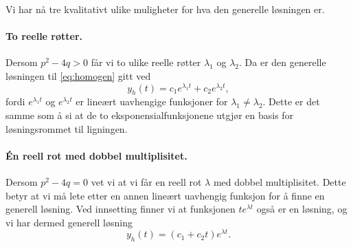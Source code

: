 \documentclass{article}
\theoremstyle{definition}
\theoremstyle{remark}
\begin{document}
\begin{multicols*}{2}
Vi har nå tre kvalitativt ulike muligheter for hva den generelle løsningen er.

\paragraph*{To reelle røtter.} Dersom $p^2 - 4q > 0$ får vi to ulike reelle røtter $\lambda_1$ og $\lambda_2$. Da er den generelle løsningen til \eqref{eq:homogen} gitt ved
\begin{equation*}
  y_h(t) = c_1 e^{\lambda_1 t} + c_2 e^{\lambda_2 t},
\end{equation*}
fordi $e^{\lambda_1 t}$ og $e^{\lambda_2 t}$ er lineært uavhengige funksjoner for $\lambda_1 \neq \lambda_2$. Dette er det samme som å si at de to eksponensialfunksjonene utgjør en basis for løsningsrommet til ligningen.

\paragraph*{Én reell rot med dobbel multiplisitet.} Dersom $p^2 - 4q = 0$ vet vi at vi får en reell rot $\lambda$ med dobbel multiplisitet. Dette betyr at vi må lete etter en annen lineært uavhengig funksjon for å finne en generell løsning. Ved innsetting finner vi at funksjonen $te^{\lambda t}$ også er en løsning, og vi har dermed generell løsning
\begin{equation*}
  y_h(t) = (c_1 + c_2 t) e^{\lambda t}.
\end{equation*}


\end{multicols*}
\end{document}
